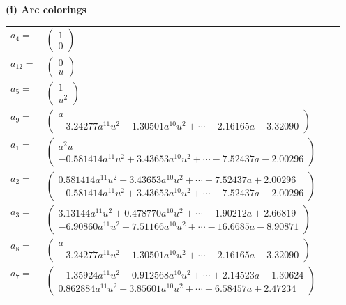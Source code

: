 \documentclass[1p]{elsarticle_modified}
\theoremstyle{definition}
\begin{document}
\flushleft \textbf{(i) Arc colorings}\\
\begin{tabular}{m{7pt} m{180pt} m{7pt} m{180pt} }
\flushright $a_{4}=$&$\begin{pmatrix}1\\0\end{pmatrix}$ \\
\flushright $a_{12}=$&$\begin{pmatrix}0\\u\end{pmatrix}$ \\
\flushright $a_{5}=$&$\begin{pmatrix}1\\u^2\end{pmatrix}$ \\
\flushright $a_{9}=$&$\begin{pmatrix}a\\-3.24277 a^{11} u^{2}+1.30501 a^{10} u^{2}+\cdots-2.16165 a-3.32090\end{pmatrix}$ \\
\flushright $a_{1}=$&$\begin{pmatrix}a^2 u\\-0.581414 a^{11} u^{2}+3.43653 a^{10} u^{2}+\cdots-7.52437 a-2.00296\end{pmatrix}$ \\
\flushright $a_{2}=$&$\begin{pmatrix}0.581414 a^{11} u^{2}-3.43653 a^{10} u^{2}+\cdots+7.52437 a+2.00296\\-0.581414 a^{11} u^{2}+3.43653 a^{10} u^{2}+\cdots-7.52437 a-2.00296\end{pmatrix}$ \\
\flushright $a_{3}=$&$\begin{pmatrix}3.13144 a^{11} u^{2}+0.478770 a^{10} u^{2}+\cdots-1.90212 a+2.66819\\-6.90860 a^{11} u^{2}+7.51166 a^{10} u^{2}+\cdots-16.6685 a-8.90871\end{pmatrix}$ \\
\flushright $a_{8}=$&$\begin{pmatrix}a\\-3.24277 a^{11} u^{2}+1.30501 a^{10} u^{2}+\cdots-2.16165 a-3.32090\end{pmatrix}$ \\
\flushright $a_{7}=$&$\begin{pmatrix}-1.35924 a^{11} u^{2}-0.912568 a^{10} u^{2}+\cdots+2.14523 a-1.30624\\0.862884 a^{11} u^{2}-3.85601 a^{10} u^{2}+\cdots+6.58457 a+2.47234\end{pmatrix}$ \\

\end{tabular}
\end{document}
